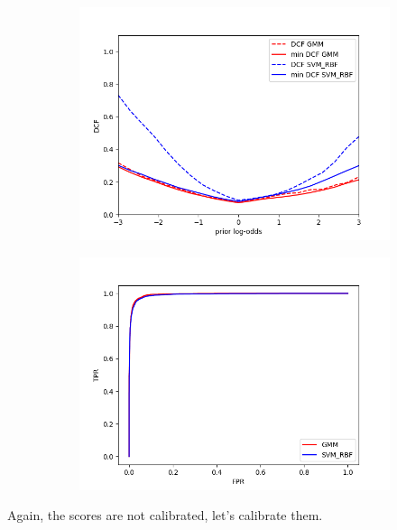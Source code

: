 \documentclass[english]{report}
\begin{document}
\begin{figure}[H]
    \begin{subfigure}{0.5\textwidth}
        \includegraphics[scale=0.5]{../../images/comparison/evaluation/DCF_GMM&SVM_RBF}
    \end{subfigure}
    \begin{subfigure}{0.5\textwidth}
        \includegraphics[scale=0.5]{../../images/comparison/evaluation/ROC_GMM&SVM_RBF}
    \end{subfigure}
    \label{fig:eval_GMMvsSVM}
\end{figure}
Again, the scores are not calibrated, let's calibrate them.
\end{document}
